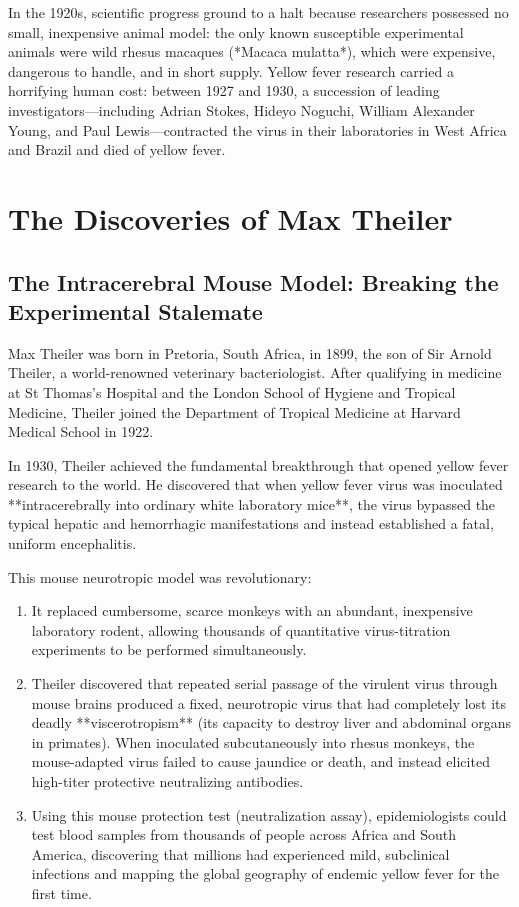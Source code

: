 In the 1920s, scientific progress ground to a halt because researchers possessed no small, inexpensive animal model: the only known susceptible experimental animals were wild rhesus macaques (*Macaca mulatta*), which were expensive, dangerous to handle, and in short supply. Yellow fever research carried a horrifying human cost: between 1927 and 1930, a succession of leading investigators—including Adrian Stokes, Hideyo Noguchi, William Alexander Young, and Paul Lewis—contracted the virus in their laboratories in West Africa and Brazil and died of yellow fever.

\section{The Discoveries of Max Theiler}

\subsection{The Intracerebral Mouse Model: Breaking the Experimental Stalemate}

Max Theiler was born in Pretoria, South Africa, in 1899, the son of Sir Arnold Theiler, a world-renowned veterinary bacteriologist. After qualifying in medicine at St Thomas's Hospital and the London School of Hygiene and Tropical Medicine, Theiler joined the Department of Tropical Medicine at Harvard Medical School in 1922.

In 1930, Theiler achieved the fundamental breakthrough that opened yellow fever research to the world. He discovered that when yellow fever virus was inoculated **intracerebrally into ordinary white laboratory mice**, the virus bypassed the typical hepatic and hemorrhagic manifestations and instead established a fatal, uniform encephalitis. 

This mouse neurotropic model was revolutionary:
\begin{enumerate}
    \item It replaced cumbersome, scarce monkeys with an abundant, inexpensive laboratory rodent, allowing thousands of quantitative virus-titration experiments to be performed simultaneously.
    \item Theiler discovered that repeated serial passage of the virulent virus through mouse brains produced a fixed, neurotropic virus that had completely lost its deadly **viscerotropism** (its capacity to destroy liver and abdominal organs in primates). When inoculated subcutaneously into rhesus monkeys, the mouse-adapted virus failed to cause jaundice or death, and instead elicited high-titer protective neutralizing antibodies.
    \item Using this mouse protection test (neutralization assay), epidemiologists could test blood samples from thousands of people across Africa and South America, discovering that millions had experienced mild, subclinical infections and mapping the global geography of endemic yellow fever for the first time.
\end{enumerate}

